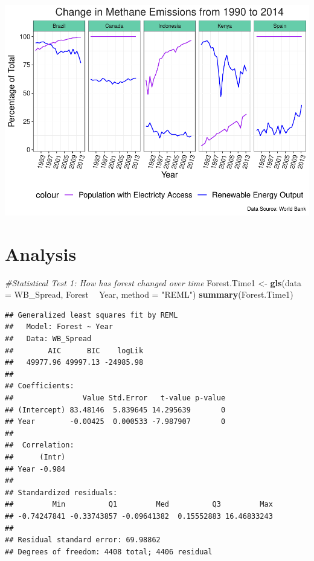 \documentclass[12pt,]{article}
\newenvironment{Shaded}{\begin{snugshade}}{\end{snugshade}}
\newcommand{\KeywordTok}[1]{\textcolor[rgb]{0.13,0.29,0.53}{\textbf{#1}}}
\newcommand{\DataTypeTok}[1]{\textcolor[rgb]{0.13,0.29,0.53}{#1}}
\newcommand{\StringTok}[1]{\textcolor[rgb]{0.31,0.60,0.02}{#1}}
\newcommand{\CommentTok}[1]{\textcolor[rgb]{0.56,0.35,0.01}{\textit{#1}}}
\newcommand{\OperatorTok}[1]{\textcolor[rgb]{0.81,0.36,0.00}{\textbf{#1}}}
\newcommand{\NormalTok}[1]{#1}
\begin{document}
\includegraphics{Marx_ENV872_Project_files/figure-latex/unnamed-chunk-9-1.pdf}

\newpage

\section{Analysis}\label{analysis}

\begin{Shaded}
\begin{Highlighting}[]
\CommentTok{#Statistical Test 1: How has forest changed over time }
\NormalTok{Forest.Time1 <-}\StringTok{ }\KeywordTok{gls}\NormalTok{(}\DataTypeTok{data =}\NormalTok{ WB_Spread, }
\NormalTok{                    Forest }\OperatorTok{~}\StringTok{ }\NormalTok{Year,}
                    \DataTypeTok{method =} \StringTok{"REML"}\NormalTok{)}
\KeywordTok{summary}\NormalTok{(Forest.Time1)}
\end{Highlighting}
\end{Shaded}

\begin{verbatim}
## Generalized least squares fit by REML
##   Model: Forest ~ Year 
##   Data: WB_Spread 
##        AIC      BIC    logLik
##   49977.96 49997.13 -24985.98
## 
## Coefficients:
##                Value Std.Error   t-value p-value
## (Intercept) 83.48146  5.839645 14.295639       0
## Year        -0.00425  0.000533 -7.987907       0
## 
##  Correlation: 
##      (Intr)
## Year -0.984
## 
## Standardized residuals:
##         Min          Q1         Med          Q3         Max 
## -0.74247841 -0.33743857 -0.09641382  0.15552883 16.46833243 
## 
## Residual standard error: 69.98862 
## Degrees of freedom: 4408 total; 4406 residual
\end{verbatim}
\end{document}

